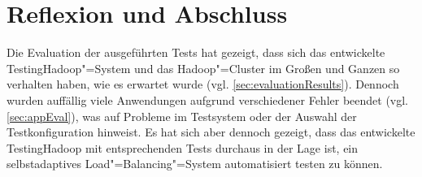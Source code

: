 \chapter{Reflexion und Abschluss}
\label{ch:outro}

Die Evaluation der ausgeführten Tests hat gezeigt, dass sich das entwickelte TestingHadoop"=System und das Hadoop"=Cluster im Großen und Ganzen so verhalten haben, wie es erwartet wurde (vgl. \cref{sec:evaluationResults}).
Dennoch wurden auffällig viele Anwendungen aufgrund verschiedener Fehler beendet (vgl. \cref{sec:appEval}), was auf Probleme im Testsystem oder der Auswahl der Testkonfiguration hinweist.
Es hat sich aber dennoch gezeigt, dass das entwickelte TestingHadoop mit entsprechenden Tests durchaus in der Lage ist, ein selbstadaptives Load"=Balancing"=System automatisiert testen zu können.




